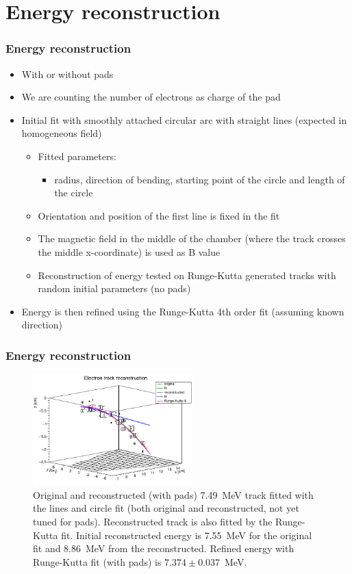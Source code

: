 \documentclass{beamer}
\begin{document}
	\section{Energy reconstruction}
	\begin{frame}
		\frametitle{Energy reconstruction}
		\begin{itemize}
			\item With or without pads
			\item We are counting the number of electrons as charge of the pad
			\item Initial fit with smoothly attached circular arc with straight lines (expected in homogeneous field)
			\begin{itemize}
				\item Fitted parameters:
				\begin{itemize}
					\item radius, direction of bending, starting point of the circle and length of the circle
				\end{itemize}
				\item Orientation and position of the first line is fixed in the fit
				\item The magnetic field in the middle of the chamber (where the track crosses the middle x-coordinate) is used as B value
				\item Reconstruction of energy tested on Runge-Kutta generated tracks with random initial parameters (no pads)
			\end{itemize}
			\item Energy is then refined using the Runge-Kutta 4th order fit (assuming known direction)
		\end{itemize}	
	\end{frame}
	\begin{frame}
		\frametitle{Energy reconstruction}
		\begin{figure}
			\centering
			\includegraphics[width=0.55\textwidth]{../images/track_fits.png}
			\caption{Original and reconstructed (with pads) 7.49~MeV track fitted with the lines and circle fit (both original and reconstructed, not yet tuned for pads). Reconstructed track is also fitted by the Runge-Kutta fit. Initial reconstructed energy is 7.55~MeV for the original fit and 8.86~MeV from the reconstructed. Refined energy with Runge-Kutta fit (with pads) is $7.374 \pm 0.037$~MeV.}
		\end{figure}
	\end{frame}
\end{document}
